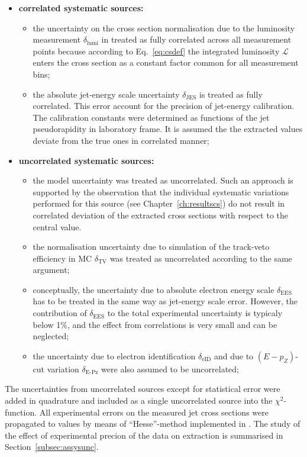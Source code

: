 \begin{itemize}
 \item \textbf{correlated systematic sources:}
 \begin{itemize}
 \item the uncertainty on the cross section normalisation due to the luminosity measurement $\delta_\text{lumi}$ in treated as fully correlated across all measurement points because according to Eq.~\eqref{eq:csdef} the integrated luminosity $\mathcal{L}$ enters the cross section as a constant factor common for all measurement bins;
 \item the absolute jet-energy scale uncertainty $\delta_\text{JES}$ is treated as fully correlated. This error account for the precision of jet-energy calibration. The calibration constants were determined as functions of the jet pseudorapidity in laboratory frame. It is assumed the the extracted values deviate from the true ones in correlated manner;
 \end{itemize}
 \item \textbf{uncorrelated systematic sources:}
 \begin{itemize}
 \item the model uncertainty was treated as uncorrelated. Such an approach is supported by the observation that the individual systematic variations performed for this source (see Chapter~\ref{ch:resultscs}) do not result in correlated deviation of the extracted cross sections with respect to the central value.
 \item the normalisation uncertainty due to simulation of the track-veto efficiency in MC $\delta_\text{TV}$ was treated as uncorrelated according to the same argument;
 \item conceptually, the uncertainty due to absolute electron energy scale $\delta_\text{EES}$ has to be treated in the same way as jet-energy scale error. However, the contribution of $\delta_\text{EES}$ to the total experimental uncertainty is typicaly below 1\%, and the effect from correlations is very small and can be neglected;
 \item the uncertainty due to electron identification $\delta_\text{eID}$ and due to $\left(E-p_Z\right)$-cut variation $\delta_\text{E-Pz}$ were also assumed to be uncorrelated;
 \end{itemize}
\end{itemize}
The uncertainties from uncorrelated sources except for statistical error were added in quadrature and included as a single uncorrelated source into the $\chi^2$-function. All experimental errors on the measured jet cross sections were propagated to \asz values by means of ``Hesse''-method implemented in \minuit. The study of the effect of experimental precion of the data on \asz extraction is summarised in Section~\ref{subsec:assysunc}.
